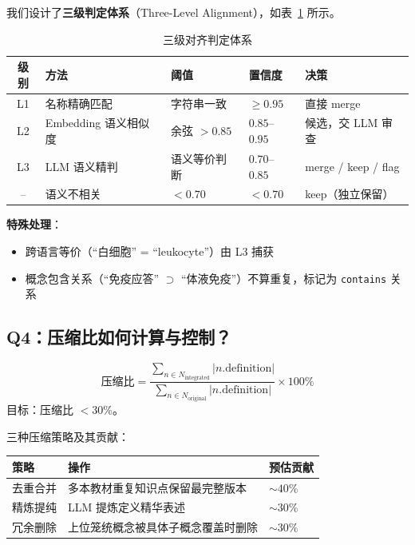 \documentclass[12pt,a4paper]{article}
\begin{document}
我们设计了\textbf{三级判定体系}（Three-Level Alignment），如表~\ref{tab:alignment} 所示。

\begin{table}[H]
\centering
\caption{三级对齐判定体系}
\label{tab:alignment}
\begin{tabularx}{\textwidth}{clllX}
\toprule
\textbf{级别} & \textbf{方法} & \textbf{阈值} & \textbf{置信度} & \textbf{决策} \\
\midrule
L1 & 名称精确匹配 & 字符串一致 & $\geq 0.95$ & 直接 merge \\
L2 & Embedding 语义相似度 & 余弦 $> 0.85$ & $0.85$--$0.95$ & 候选，交 LLM 审查 \\
L3 & LLM 语义精判 & 语义等价判断 & $0.70$--$0.85$ & merge / keep / flag \\
-- & 语义不相关 & $< 0.70$ & $< 0.70$ & keep（独立保留） \\
\bottomrule
\end{tabularx}
\end{table}

\textbf{特殊处理}：
\begin{itemize}[leftmargin=2em]
    \item 跨语言等价（``白细胞'' = ``leukocyte''）由 L3 捕获
    \item 概念包含关系（``免疫应答'' $\supset$ ``体液免疫''）不算重复，标记为 \texttt{contains} 关系
\end{itemize}

\subsection{Q4：压缩比如何计算与控制？}

\begin{keybox}[压缩比公式]
\begin{equation}
\text{压缩比} = \frac{\displaystyle\sum_{n \in N_{\text{integrated}}} |n.\text{definition}|}{\displaystyle\sum_{n \in N_{\text{original}}} |n.\text{definition}|} \times 100\%
\end{equation}
目标：压缩比 $< 30\%$。
\end{keybox}

三种压缩策略及其贡献：

\begin{table}[H]
\centering
\begin{tabular}{lll}
\toprule
\textbf{策略} & \textbf{操作} & \textbf{预估贡献} \\
\midrule
去重合并 & 多本教材重复知识点保留最完整版本 & $\sim 40\%$ \\
精炼提纯 & LLM 提炼定义精华表述 & $\sim 30\%$ \\
冗余删除 & 上位笼统概念被具体子概念覆盖时删除 & $\sim 30\%$ \\
\bottomrule
\end{tabular}
\end{table}
\end{document}
